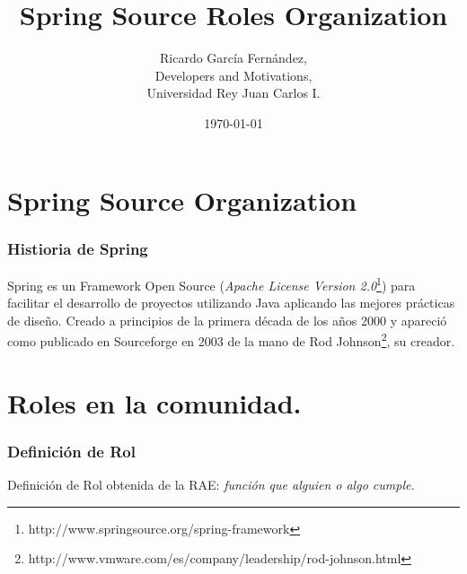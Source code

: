 \documentclass[xcolor=dvipsnames]{beamer}
\title{Spring Source Roles Organization}
\author{Ricardo Garc\'ia Fern\'andez,\\
        Developers and Motivations,\\
        Universidad Rey Juan Carlos I.}
\date{\today}
\begin{document}


\section[\'Indice]{}
\begin{frame}[allowframebreaks]
\tableofcontents
\end{frame}

\section{Spring Source Organization}
\begin{frame}[allowframebreaks]
\frametitle{Histioria de Spring}
Spring es un Framework Open Source (\emph{Apache License Version 2.0}\footnote{http://www.springsource.org/spring-framework}) para facilitar el desarrollo de proyectos utilizando Java aplicando las mejores pr\'acticas de dise\~no. Creado a principios de la primera d\'ecada de los a\~nos 2000 y apareci\'o como publicado en Sourceforge en 2003 de la mano de Rod Johnson\footnote{http://www.vmware.com/es/company/leadership/rod-johnson.html}, su creador.
\end{frame}

\section{Roles en la comunidad.}
\begin{frame}[allowframebreaks]
\frametitle{Definici\'on de Rol}
Definici\'on de Rol obtenida de la RAE: \emph{funci\'on que alguien o algo cumple.}
\end{frame}
\end{document}
